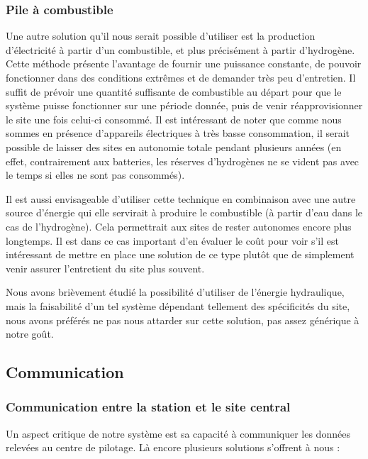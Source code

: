 \subsubsection{Pile à combustible}

Une autre solution qu’il nous serait possible d’utiliser est la production d’électricité à partir d’un combustible, et plus précisément à partir d’hydrogène. Cette méthode présente l’avantage de fournir une puissance constante, de pouvoir fonctionner dans des conditions extrêmes et de demander très peu d’entretien. Il suffit de prévoir une quantité suffisante de combustible au départ pour que le système puisse fonctionner sur une période donnée, puis de venir réapprovisionner le site une fois celui-ci consommé. Il est intéressant de noter que comme nous sommes en présence d’appareils électriques à très basse consommation, il serait possible de laisser des sites en autonomie totale pendant plusieurs années (en effet, contrairement aux batteries, les réserves d’hydrogènes ne se vident pas avec le temps si elles ne sont pas consommés).

Il est aussi envisageable d’utiliser cette technique en combinaison avec une autre source d’énergie qui elle servirait à produire le combustible (à partir d’eau dans le cas de l’hydrogène). Cela permettrait aux sites de rester autonomes encore plus longtemps. Il est dans ce cas important d’en évaluer le coût pour voir s’il est intéressant de mettre en place une solution de ce type plutôt que de simplement venir assurer l’entretient du site plus souvent.

Nous avons brièvement étudié la possibilité d’utiliser de l’énergie hydraulique, mais la faisabilité d’un tel système dépendant tellement des spécificités du site, nous avons préférés ne pas nous attarder sur cette solution, pas assez générique à notre goût.

\subsection{Communication}

\subsubsection{Communication entre la station et le site central}

Un aspect critique de notre système est sa capacité à communiquer les données relevées au centre de pilotage. Là encore plusieurs solutions s’offrent à nous :

